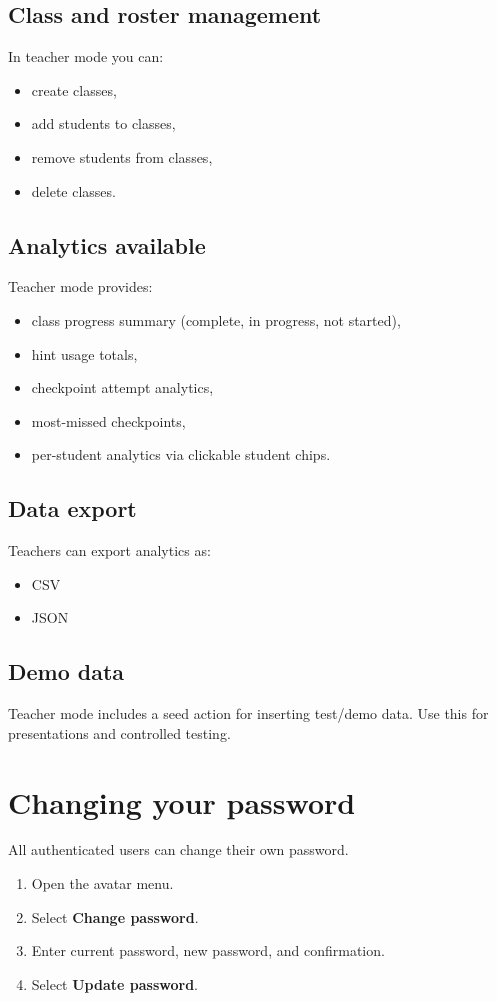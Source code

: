 \documentclass[11pt,a4paper]{article}
\begin{document}
\subsection{Class and roster management}
In teacher mode you can:
\begin{itemize}
  \item create classes,
  \item add students to classes,
  \item remove students from classes,
  \item delete classes.
\end{itemize}

\subsection{Analytics available}
Teacher mode provides:
\begin{itemize}
  \item class progress summary (complete, in progress, not started),
  \item hint usage totals,
  \item checkpoint attempt analytics,
  \item most-missed checkpoints,
  \item per-student analytics via clickable student chips.
\end{itemize}

\subsection{Data export}
Teachers can export analytics as:
\begin{itemize}
  \item CSV
  \item JSON
\end{itemize}

\subsection{Demo data}
Teacher mode includes a seed action for inserting test/demo data.
Use this for presentations and controlled testing.

\section{Changing your password}
All authenticated users can change their own password.

\begin{enumerate}
  \item Open the avatar menu.
  \item Select \textbf{Change password}.
  \item Enter current password, new password, and confirmation.
  \item Select \textbf{Update password}.
\end{enumerate}
\end{document}
